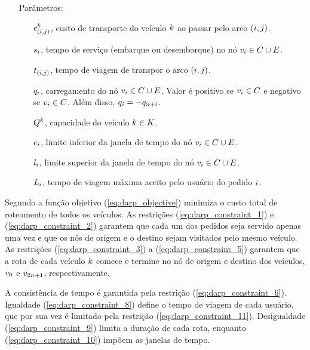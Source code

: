 \begin{itemize}
\item[]{Parâmetros:}
  \begin{itemize}
    \item[$c_{(i,j)}^{k}$,] custo de transporte do veículo
      $k$ ao passar pelo arco $(i,j)$.
    \item[$s_{i}$,] tempo de serviço (embarque ou desembarque) no
      nó $v_{i} \in C \cup E$.
    \item[$t_{(i,j)}$,] tempo de viagem de transpor o arco
      $(i,j)$.
    \item[$q_{i}$,] carregamento do nó $v_{i} \in C \cup 
      E$. 
      Valor é positivo se $v_{i} \in C$ e negativo se
      $v_{i} \in C$.
      Além disso, $q_{i} = -q_{n + i}$.
    \item[$Q^{k}$,] capacidade do veículo $k \in 
      K$.
    \item[$e_i$,] limite inferior da janela de tempo do nó
      $v_{i} \in C \cup E$.
    \item[$l_i$,] limite superior da janela de tempo do nó
      $v_{i} \in C \cup E$.
    \item[$L_i$,] tempo de viagem máxima aceito pelo usuário do
      pedido $i$.
  \end{itemize}
\end{itemize}

Segundo \textcite{cordeau_branch-and-cut_2006}
a função objetivo (\ref{eq:darp_objective})  minimiza o custo total de 
roteamento de todos os veículos. 
As restrições (\ref{eq:darp_constraint_1}) e (\ref{eq:darp_constraint_2}) 
garantem que cada um dos pedidos seja servido apenas uma vez e que os nós de 
origem e o destino sejam visitados pelo mesmo veículo.
As restrições (\ref{eq:darp_constraint_3}) a (\ref{eq:darp_constraint_5})
garantem que a rota de cada veículo $k$ comece e termine no nó de origem
e destino dos veículos, $v_{0}$ e $v_{2n + 1}$, respectivamente.

A consistência de tempo é garantida pela restrição
(\ref{eq:darp_constraint_6}).
Igualdade (\ref{eq:darp_constraint_8}) define o tempo de viagem de cada
usuário, que por sua vez é limitado pela restrição
(\ref{eq:darp_constraint_11}).
Desigualdade (\ref{eq:darp_constraint_9}) limita a duração de cada
rota, enquanto (\ref{eq:darp_constraint_10}) impõem as janelas de tempo.



